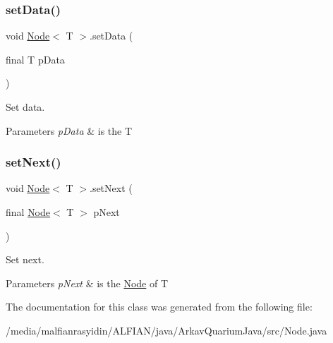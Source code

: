 \subsubsection{\texorpdfstring{set\+Data()}{setData()}}
{\footnotesize\ttfamily void \mbox{\hyperlink{class_node}{Node}}$<$ T $>$.set\+Data (\begin{DoxyParamCaption}\item[{final T}]{p\+Data }\end{DoxyParamCaption})\hspace{0.3cm}{\ttfamily [inline]}}

Set data.


\begin{DoxyParams}{Parameters}
{\em p\+Data} & is the T \\
\hline
\end{DoxyParams}
\mbox{\label{class_node_a3fe482188599b86b0a11239a47a88443}} 
\subsubsection{\texorpdfstring{set\+Next()}{setNext()}}
{\footnotesize\ttfamily void \mbox{\hyperlink{class_node}{Node}}$<$ T $>$.set\+Next (\begin{DoxyParamCaption}\item[{final \mbox{\hyperlink{class_node}{Node}}$<$ T $>$}]{p\+Next }\end{DoxyParamCaption})\hspace{0.3cm}{\ttfamily [inline]}}

Set next.


\begin{DoxyParams}{Parameters}
{\em p\+Next} & is the \mbox{\hyperlink{class_node}{Node}} of T \\
\hline
\end{DoxyParams}


The documentation for this class was generated from the following file\+:\begin{DoxyCompactItemize}
\item 
/media/malfianrasyidin/\+A\+L\+F\+I\+A\+N/java/\+Arkav\+Quarium\+Java/src/Node.\+java\end{DoxyCompactItemize}
